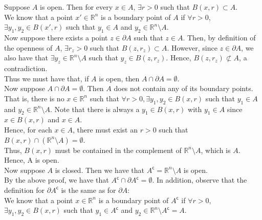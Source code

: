 \documentclass[12pt]{article}
\newenvironment{problem}[2][Problem]{\begin{trivlist}
\item[\hskip \labelsep {\bfseries #1}\hskip \labelsep {\bfseries #2.}]}{\end{trivlist}}
\begin{document}
\begin{problem}{2}
\end{problem}

Suppose $A$ is open. Then for every $x \in A$, $\exists r > 0$ such that $B(x, r) \subset A$.\\

We know that a point $x' \in \mathbb{R}^n$ is a boundary point of $A$ if $\forall r > 0$, $\exists y_1, y_2 \in B(x', r)$ such that $y_1 \in A$ and $y_2 \in \mathbb{R}^n \setminus A$.\\

Now suppose there exists a point $z \in \partial A$ such that $z \in A$. Then, by definition of the openness of $A$, $\exists r_z > 0$ such that $B(z, r_z) \subset A$. However, since $z \in \partial A$, we also have that $\exists y_z \in \mathbb{R}^n \setminus A$ such that $y_z \in B(z, r_z)$. Hence, $B(z, r_z) \not\subset A$, a contradiction.\\

Thus we must have that, if $A$ is open, then $A \cap \partial A = \emptyset$.\\

Now suppose $A \cap \partial A = \emptyset$. Then $A$ does not contain any of its boundary points. That is, there is no $x \in \mathbb{R}^n$ such that $\forall r > 0, \exists y_1, y_2 \in B(x, r)$ such that $y_1 \in A$ and $y_2 \in \mathbb{R}^n \setminus A$. Note that there is always a $y_1 \in B(x, r)$ with $y_1 \in A$ since $x \in B(x, r)$ and $x \in A$.\\

Hence, for each $x \in A$, there must exist an $r > 0$ such that $B(x, r) \cap \left(\mathbb{R}^n \setminus A\right) = \emptyset$.\\

Thus, $B(x, r)$ must be contained in the complement of $\mathbb{R}^n \setminus A$, which is $A$. Hence, A is open.\\

Now suppose $A$ is closed. Then we have that $A^\mathsf{c} = \mathbb{R}^n \setminus A$ is open.\\

By the above proof, we have that $A^\mathsf{c} \cap \partial A^\mathsf{c} = \emptyset$. In addition, observe that the definition for $\partial A^\mathsf{c}$ is the same as for $\partial A$:\\

We know that a point $x \in \mathbb{R}^n$ is a boundary point of $A^\mathsf{c}$ if $\forall r > 0$, $\exists y_1, y_2 \in B(x, r)$ such that $y_1 \in A^\mathsf{c}$ and $y_2 \in \mathbb{R}^n \setminus A^\mathsf{c} = A$.\\
\end{document}
